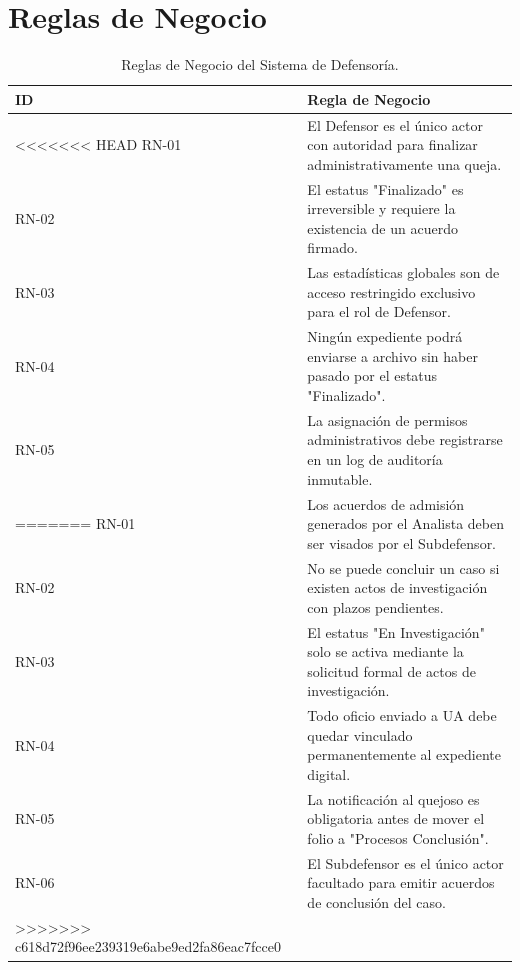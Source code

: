 \section{Reglas de Negocio}
\begin{table}[h!]
\centering
\caption{Reglas de Negocio del Sistema de Defensoría.}
\label{tab:business_rules}
\begin{tabular}{@{} l p{12cm} @{}}
\toprule
\rowcolor[HTML]{2D3E50} 
\textbf{\color[HTML]{FFFFFF} ID} & \textbf{\color[HTML]{FFFFFF} Regla de Negocio} \\ \midrule
\rowcolor[HTML]{F2F4F7} 
<<<<<<< HEAD
RN-01 & El Defensor es el único actor con autoridad para finalizar administrativamente una queja. \\
RN-02 & El estatus "Finalizado" es irreversible y requiere la existencia de un acuerdo firmado. \\
\rowcolor[HTML]{F2F4F7} 
RN-03 & Las estadísticas globales son de acceso restringido exclusivo para el rol de Defensor. \\
RN-04 & Ningún expediente podrá enviarse a archivo sin haber pasado por el estatus "Finalizado". \\
\rowcolor[HTML]{F2F4F7} 
RN-05 & La asignación de permisos administrativos debe registrarse en un log de auditoría inmutable. \\ \bottomrule
=======
RN-01 & Los acuerdos de admisión generados por el Analista deben ser visados por el Subdefensor. \\
RN-02 & No se puede concluir un caso si existen actos de investigación con plazos pendientes. \\
\rowcolor[HTML]{F2F4F7} 
RN-03 & El estatus "En Investigación" solo se activa mediante la solicitud formal de actos de investigación. \\
RN-04 & Todo oficio enviado a UA debe quedar vinculado permanentemente al expediente digital. \\
\rowcolor[HTML]{F2F4F7} 
RN-05 & La notificación al quejoso es obligatoria antes de mover el folio a "Procesos Conclusión". \\
RN-06 & El Subdefensor es el único actor facultado para emitir acuerdos de conclusión del caso. \\ \bottomrule
>>>>>>> c618d72f96ee239319e6abe9ed2fa86eac7fcce0
\end{tabular}
\end{table}